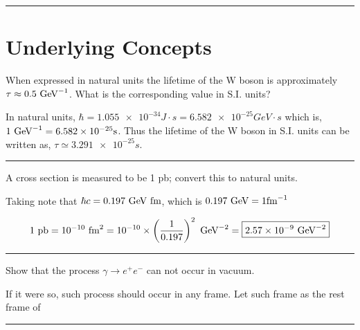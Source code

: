 \noindent\rule{7in}{2.8pt}
\section{Underlying Concepts}
\begin{problem}{2.1}
When expressed in natural units the lifetime of the W boson is approximately $\tau \approx 0.5\text{ GeV}^{-1}$. What is the corresponding value in S.I. units?
\end{problem}
\begin{solution}
In natural units, $\hbar = \num{1.055e-34}\unit{J\cdot s} = \num{6.582e-25} \unit{GeV\cdot s}$ which is, $1 \GeV^{-1} = \num{6.582e-25} \unit{s}$.
Thus the lifetime of the W boson in S.I. units can be written as, $\boxed{\tau \simeq \num{3.291e-25} \unit{s}}$.\\
\end{solution} 
\noindent\rule{7in}{1.5pt}


\begin{problem}{2.2}
A cross section is measured to be 1 pb; convert this to natural units.
\end{problem}
\begin{solution}
Taking note that $\hbar c = 0.197 \text{ GeV} \text{ fm}$, which is $0.197 \GeV = 1 \unit{\femto\metre}^{-1}$

\begin{align*}
    1 \text{ pb} = 10^{-10} \text{ fm}^2 = 10^{-10} \times \left( \frac{1}{0.197} \right)^2 \text{ GeV}^{-2} = \boxed{\num{2.57e-9}\text{ GeV}^{-2}}
\end{align*}
\end{solution} 
\noindent\rule{7in}{1.5pt}


\begin{problem}{2.3}
Show that the process $\gamma\to e^+ e^-$ can not occur in vacuum.
\end{problem}
\begin{solution}
If it were so, such process should occur in any frame. Let such frame as the rest frame of

\end{solution} 
\noindent\rule{7in}{1.5pt}


